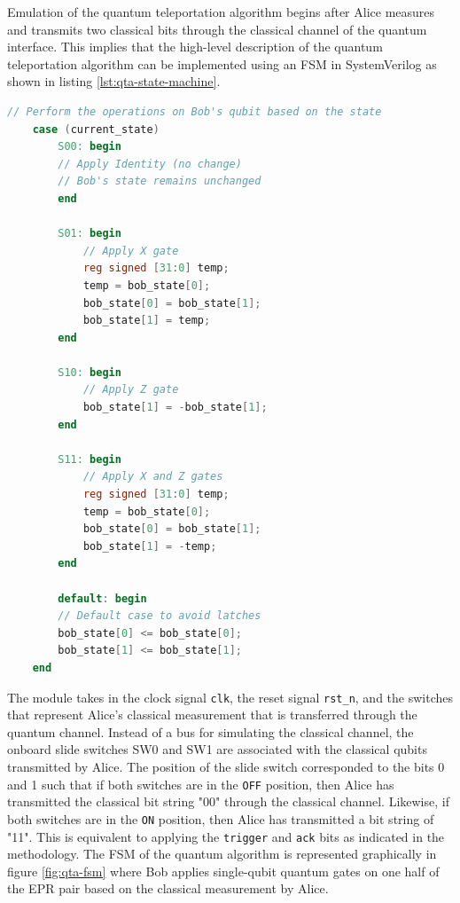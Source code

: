 Emulation of the quantum teleportation algorithm begins after Alice measures and transmits two classical bits through the classical channel of the quantum interface. This implies that the high-level description of the quantum teleportation algorithm can be implemented using an FSM in SystemVerilog as shown in listing \ref{lst:qta-state-machine}. 
\begin{lstlisting}[language=Verilog, caption={SystemVerilog RTL code for emulating the quantum teleportation algorithm using a FSM.}, label={lst:qta-state-machine}]
	// Perform the operations on Bob's qubit based on the state
	case (current_state)
		S00: begin
		// Apply Identity (no change)
		// Bob's state remains unchanged
		end
		
		S01: begin
			// Apply X gate
			reg signed [31:0] temp;
			temp = bob_state[0];
			bob_state[0] = bob_state[1];
			bob_state[1] = temp;
		end
		
		S10: begin
			// Apply Z gate 
			bob_state[1] = -bob_state[1];
		end
		
		S11: begin
			// Apply X and Z gates 
			reg signed [31:0] temp;
			temp = bob_state[0];
			bob_state[0] = bob_state[1];
			bob_state[1] = -temp;
		end
		
		default: begin
		// Default case to avoid latches
		bob_state[0] <= bob_state[0];
		bob_state[1] <= bob_state[1];
	end
\end{lstlisting}
The module takes in the clock signal \texttt{clk}, the reset signal \texttt{rst\_n}, and the switches that represent Alice's classical measurement that is transferred through the quantum channel. Instead of a bus for simulating the classical channel, the onboard slide switches SW0 and SW1 are associated with the classical qubits transmitted by Alice. The position of the slide switch corresponded to the bits 0 and 1 such that if both switches are in the \texttt{OFF} position, then Alice has transmitted the classical bit string "00" through the classical channel. Likewise, if both switches are in the \texttt{ON} position, then Alice has transmitted a bit string of "11". This is equivalent to applying the \texttt{trigger} and \texttt{ack} bits as indicated in the methodology. The FSM of the quantum algorithm is represented graphically in figure \ref{fig:qta-fsm} where Bob applies single-qubit quantum gates on one half of the EPR pair based on the classical measurement by Alice. 
